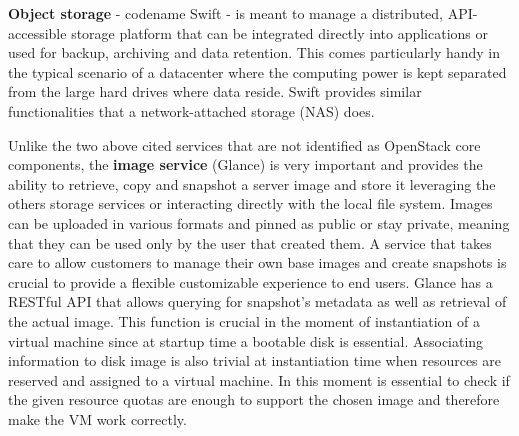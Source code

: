 \textbf{Object storage} - codename Swift - is meant to manage a distributed, API-accessible storage platform that can be integrated directly into applications or used for backup, archiving and data retention. This comes particularly handy in the typical scenario of a datacenter where the computing power is kept separated from the large hard drives where data reside. Swift provides similar functionalities that a network-attached storage (NAS) does.

Unlike the two above cited services that are not identified as OpenStack core components, the \textbf{image service} (Glance) is very important and provides the ability to retrieve, copy and snapshot a server image and store it leveraging the others storage services or interacting directly with the local file system.
Images can be uploaded in various formats and pinned as public or stay private, meaning that they can be used only by the user that created them.
A service that takes care to allow customers to manage their own base images and create snapshots is crucial to provide a flexible customizable experience to end users.
Glance has a RESTful API that allows querying for snapshot's metadata as well as retrieval of the actual image.
This function is crucial in the moment of instantiation of a virtual machine since at startup time a bootable disk is essential.
Associating information to disk image is also trivial at instantiation time when resources are reserved and assigned to a virtual machine. In this moment is essential to check if the given resource quotas are enough to support the chosen image and therefore make the VM work correctly.

